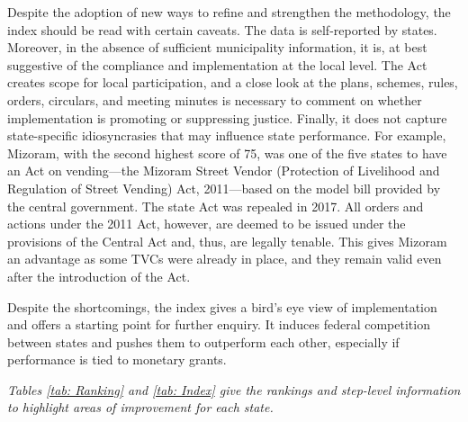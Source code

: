 \documentclass[a4paper, 12pt, twoside]{article}
\begin{document}
{	Despite the adoption of new ways to refine and strengthen the methodology, the index should be read with certain caveats. The data is self-reported by states. Moreover, in the absence of sufficient municipality information, it is, at best suggestive of the compliance and implementation at the local level. The Act creates scope for local participation, and a close look at the plans, schemes, rules, orders, circulars, and meeting minutes is necessary to comment on whether implementation is  promoting or suppressing justice. Finally, it does not capture state-specific idiosyncrasies that may influence state performance. For example, Mizoram, with the second highest score of 75, was one of the five states to have an Act on vending—the Mizoram Street Vendor (Protection of Livelihood and Regulation of Street Vending) Act, 2011—based on the model bill provided by the central government. The state Act was repealed in 2017. All orders and actions under the 2011 Act, however, are deemed to be issued under the provisions of the Central Act and, thus, are legally tenable. This gives Mizoram an advantage as some TVCs were already in place, and they remain valid even after the introduction of the Act.

	Despite the shortcomings, the index gives a bird’s eye view of implementation and offers a starting point for further enquiry. It induces federal competition between states and pushes them to outperform each other, especially if performance is tied to monetary grants.

	\textit{Tables \ref{tab: Ranking} and \ref{tab: Index} give the rankings and step-level information to highlight areas of improvement for each state.}

}
\end{document}
